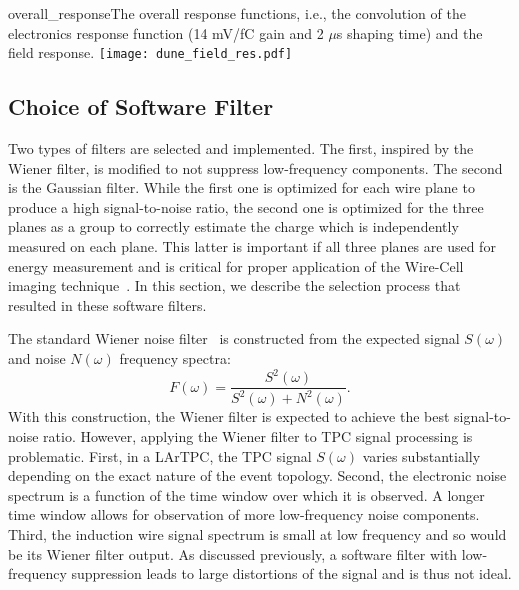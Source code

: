 \begin{cdrfigure}{overall_response}{The overall response functions, i.e., %
the convolution of the
electronics response function (14 mV/fC gain and 2 $\mu$s shaping time) 
and the field response.}
\texttt{[image: dune\_field\_res.pdf]}
\end{cdrfigure}

\subsection{Choice of Software Filter}

Two types of filters are selected and implemented.  The first, inspired by the Wiener filter,  
 is modified to not suppress low-frequency components.  The second is the 
Gaussian filter. While the first one is optimized  for each wire plane to produce a 
high signal-to-noise ratio, the second one is optimized for the three planes as a group %
to correctly estimate the charge which is independently measured on each  plane. %
This latter is important if all three planes are used for energy measurement 
and is critical for proper application of the Wire-Cell imaging technique~\cite{wire-cell}.  
In this section, we describe the selection process that resulted in %
these software filters.

The standard Wiener noise filter~\cite{wiener} is constructed from the expected 
signal $S(\omega)$ and noise $N(\omega)$ frequency spectra:
\begin{equation}
F(\omega) = \frac{S^2(\omega)}{S^2(\omega) + N^2(\omega)}.
\end{equation}
With this construction, the Wiener filter is expected to achieve the best signal-to-noise ratio. 
However, applying the Wiener filter to TPC signal processing is problematic. 
First, in a LArTPC, the TPC signal $S(\omega)$ varies substantially
depending on the exact nature of the event topology.
Second, the electronic noise spectrum is a function of the time window
over which it is observed. A longer time window allows for observation
of more low-frequency noise components.
Third, the induction wire signal spectrum is small at low frequency
and so would be its Wiener filter output.  As discussed previously, 
a software filter with low-frequency suppression leads to large distortions 
of the signal and is thus not ideal.  

